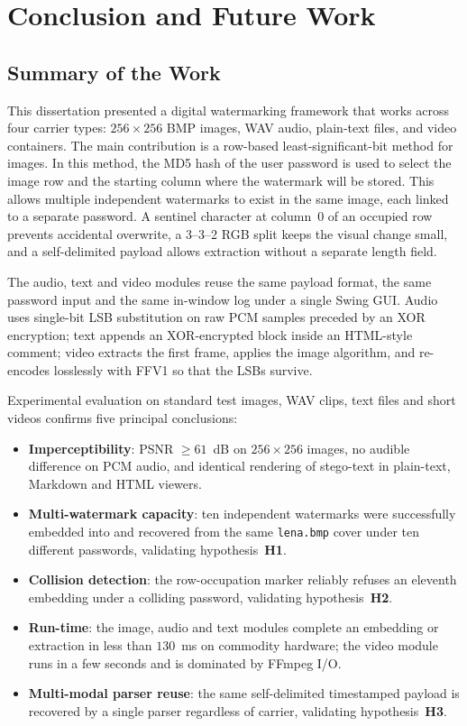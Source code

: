 \chapter{Conclusion and Future Work}
\label{Conclusion_and_Future_Work}

\section{Summary of the Work}

This dissertation presented a digital watermarking framework that works across four carrier types: $256 \times 256$ BMP images, WAV audio, plain-text files, and video containers. The main contribution is a row-based least-significant-bit method for images. In this method, the MD5 hash of the user password is used to select the image row and the starting column where the watermark will be stored. This allows multiple independent watermarks to exist in the same image, each linked to a separate password. A sentinel character at column~0 of an occupied row prevents accidental overwrite, a 3--3--2 RGB split keeps the visual change small, and a self-delimited payload allows extraction without a separate length field.

The audio, text and video modules reuse the same payload format, the same password input and the same in-window log under a single Swing GUI. Audio uses single-bit LSB substitution on raw PCM samples preceded by an XOR encryption; text appends an XOR-encrypted block inside an HTML-style comment; video extracts the first frame, applies the image algorithm, and re-encodes losslessly with FFV1 so that the LSBs survive.

Experimental evaluation on standard test images, WAV clips, text files and short videos confirms five principal conclusions:

\begin{itemize}
    \item \textbf{Imperceptibility}: PSNR $\ge 61$~dB on $256 \times 256$ images, no audible difference on PCM audio, and identical rendering of stego-text in plain-text, Markdown and HTML viewers.
    \item \textbf{Multi-watermark capacity}: ten independent watermarks were successfully embedded into and recovered from the same \texttt{lena.bmp} cover under ten different passwords, validating hypothesis~\textbf{H1}.
    \item \textbf{Collision detection}: the row-occupation marker reliably refuses an eleventh embedding under a colliding password, validating hypothesis~\textbf{H2}.
    \item \textbf{Run-time}: the image, audio and text modules complete an embedding or extraction in less than $130$~ms on commodity hardware; the video module runs in a few seconds and is dominated by FFmpeg I/O.
    \item \textbf{Multi-modal parser reuse}: the same self-delimited timestamped payload is recovered by a single parser regardless of carrier, validating hypothesis~\textbf{H3}.
\end{itemize}

